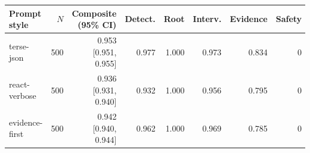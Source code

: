 \begin{tabular}{lrrrrrrr}
\toprule
Prompt style & $N$ & Composite (95\% CI) & Detect. & Root & Interv. & Evidence & Safety \\
\midrule
terse-json & 500 & 0.953 [0.951, 0.955] & 0.977 & 1.000 & 0.973 & 0.834 & 0 \\
react-verbose & 500 & 0.936 [0.931, 0.940] & 0.932 & 1.000 & 0.956 & 0.795 & 0 \\
evidence-first & 500 & 0.942 [0.940, 0.944] & 0.962 & 1.000 & 0.969 & 0.785 & 0 \\
\bottomrule
\end{tabular}
